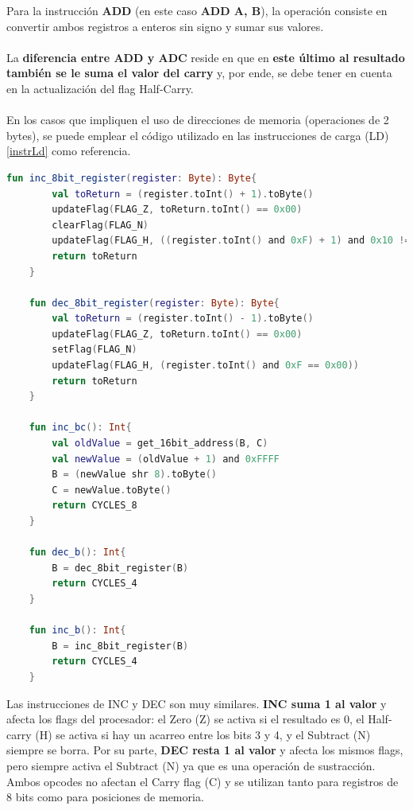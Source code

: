 Para la instrucción \textbf{ADD} (en este caso \textbf{ADD A, B}), la operación consiste en convertir ambos registros a enteros sin signo y sumar sus valores.
\\\\
La \textbf{diferencia entre ADD y ADC} reside en que en \textbf{este último al resultado también se le suma el valor del carry} y, por ende, se debe tener en cuenta en la actualización del flag Half-Carry.
\\\\
En los casos que impliquen el uso de direcciones de memoria (operaciones de 2 bytes), se puede emplear el código utilizado en las instrucciones de carga (LD) \ref{instrLd} como referencia.
\clearpage
\begin{lstlisting}[language=Kotlin, caption={Operaciones INC y DEC}, label={code:kotlinincdec}]
    fun inc_8bit_register(register: Byte): Byte{
        val toReturn = (register.toInt() + 1).toByte()
        updateFlag(FLAG_Z, toReturn.toInt() == 0x00)
        clearFlag(FLAG_N)
        updateFlag(FLAG_H, ((register.toInt() and 0xF) + 1) and 0x10 != 0x00)
        return toReturn
    }

    fun dec_8bit_register(register: Byte): Byte{
        val toReturn = (register.toInt() - 1).toByte()
        updateFlag(FLAG_Z, toReturn.toInt() == 0x00)
        setFlag(FLAG_N)
        updateFlag(FLAG_H, (register.toInt() and 0xF == 0x00))
        return toReturn
    }

    fun inc_bc(): Int{
        val oldValue = get_16bit_address(B, C)
        val newValue = (oldValue + 1) and 0xFFFF
        B = (newValue shr 8).toByte()
        C = newValue.toByte()
        return CYCLES_8
    }

    fun dec_b(): Int{
        B = dec_8bit_register(B)
        return CYCLES_4
    }

    fun inc_b(): Int{
        B = inc_8bit_register(B)
        return CYCLES_4
    }
\end{lstlisting}

Las instrucciones de INC y DEC son muy similares. \textbf{INC suma 1 al valor} y afecta los flags del procesador: el Zero (Z) se activa si el resultado es 0, el Half-carry (H) se activa si hay un acarreo entre los bits 3 y 4, y el Subtract (N) siempre se borra. Por su parte, \textbf{DEC resta 1 al valor} y afecta los mismos flags, pero siempre activa el Subtract (N) ya que es una operación de sustracción. Ambos opcodes no afectan el Carry flag (C) y se utilizan tanto para registros de 8 bits como para posiciones de memoria.

